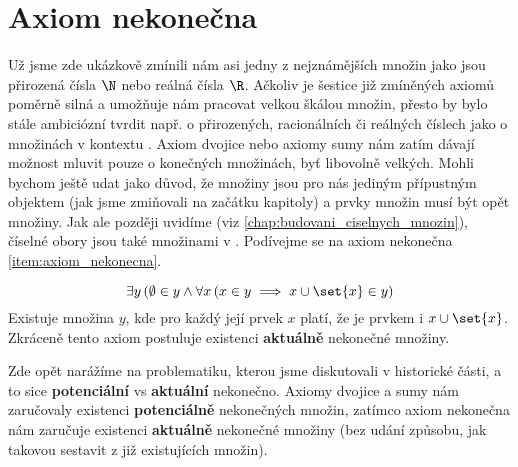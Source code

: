 \section{Axiom nekonečna}\label{sec:axiom_nekonecna}
Už jsme zde ukázkově zmínili nám asi jedny z nejznámějších množin jako jsou přirozená čísla $\N$ nebo reálná čísla $\R$. Ačkoliv je šestice již zmíněných axiomů poměrně silná a umožňuje nám pracovat velkou škálou množin, přesto by bylo stále ambiciózní tvrdit např. o přirozených, racionálních či reálných číslech jako o množinách v kontextu \ZF{}. Axiom dvojice nebo axiomy sumy nám zatím dávají možnost mluvit pouze o konečných množinách, byť libovolně velkých. Mohli bychom ještě udat jako důvod, že množiny jsou pro nás jediným přípustným objektem (jak jsme zmiňovali na začátku kapitoly) a prvky množin musí být opět množiny. Jak ale později uvidíme (viz \ref{chap:budovani_ciselnych_mnozin}), číselné obory jsou také množinami v \ZF{}. Podívejme se na axiom nekonečna \ref{item:axiom_nekonecna}.
\medskip

\begin{equation*}
    \exists y\, (\emptyset\in y \land \forall x\,(x\in y\implies x\cup\set{x}\in y)
\end{equation*}
Existuje množina $y$, kde pro každý její prvek $x$ platí, že je prvkem i $x\cup\set{x}$. Zkráceně tento axiom postuluje existenci \textbf{aktuálně} nekonečné množiny.\par
Zde opět narážíme na problematiku, kterou jsme diskutovali v historické části, a to sice \textbf{potenciální} vs \textbf{aktuální} nekonečno. Axiomy dvojice a sumy nám zaručovaly existenci \textbf{potenciálně} nekonečných množin, zatímco axiom nekonečna nám zaručuje existenci \textbf{aktuálně} nekonečné množiny (bez udání způsobu, jak takovou sestavit z již existujících množin).\par